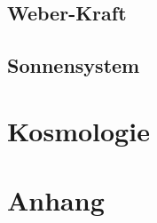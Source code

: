 \documentclass{book}
\numberwithin{equation}{section}
\begin{document}
\chapter{Weber-Kraft}





\chapter{Sonnensystem}



\part{Kosmologie}

\part{Anhang}


\end{document}

